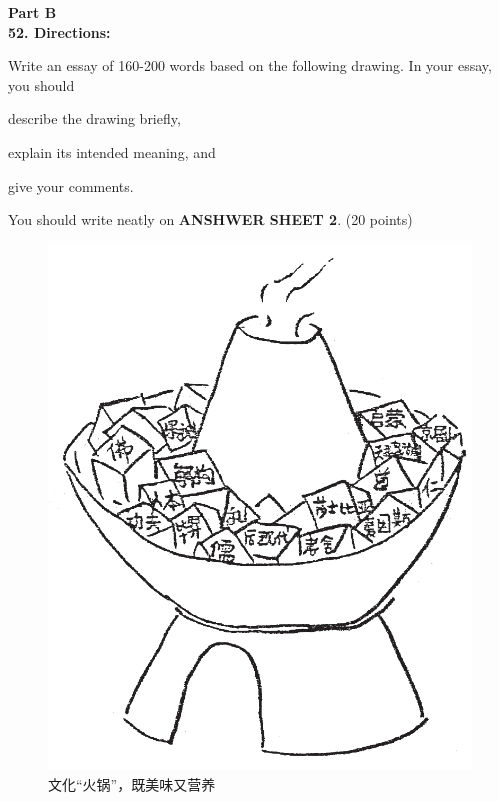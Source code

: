\noindent
\textbf{Part B}\\
\textbf{52. Directions:}

Write an essay of 160-200 words based on the following drawing. In your
essay, you should
\begin{listwrite}
	\item
 describe the drawing briefly,

\item 
 explain its intended meaning, and 

\item 
 give your comments.
\end{listwrite}

You should write neatly on \textbf{ANSHWER SHEET 2}. (20 points)


\begin{figure}[h!]
	\centering
	\includegraphics[width=0.36\linewidth]{picture/2010.png}
	\caption*{文化“火锅”，既美味又营养}
\end{figure}

